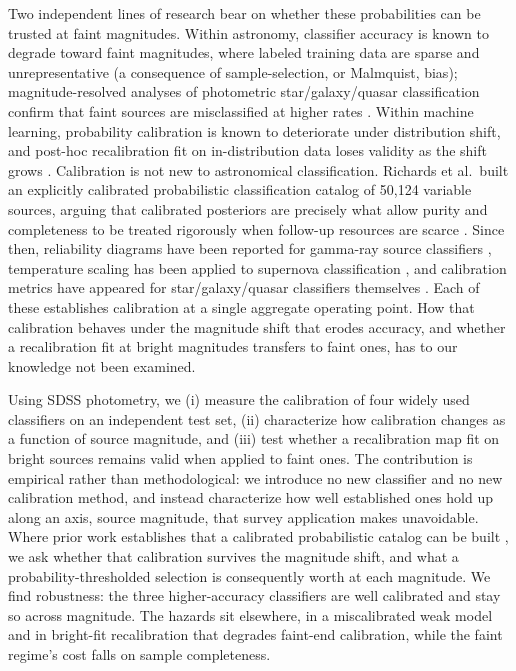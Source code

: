 \documentclass[conference]{IEEEtran}
\begin{document}
Two independent lines of research bear on whether these probabilities can be trusted at faint magnitudes. Within astronomy, classifier accuracy is known to degrade toward faint magnitudes, where labeled training data are sparse and unrepresentative (a consequence of sample-selection, or Malmquist, bias); magnitude-resolved analyses of photometric star/galaxy/quasar classification confirm that faint sources are misclassified at higher rates \cite{r9}. Within machine learning, probability calibration is known to deteriorate under distribution shift, and post-hoc recalibration fit on in-distribution data loses validity as the shift grows \cite{r5}. Calibration is not new to astronomical classification. Richards et al.\ built an explicitly calibrated probabilistic classification catalog of 50{,}124 variable sources, arguing that calibrated posteriors are precisely what allow purity and completeness to be treated rigorously when follow-up resources are scarce \cite{r13}. Since then, reliability diagrams have been reported for gamma-ray source classifiers \cite{r6}, temperature scaling has been applied to supernova classification \cite{r7}, and calibration metrics have appeared for star/galaxy/quasar classifiers themselves \cite{r12}. Each of these establishes calibration at a single aggregate operating point. How that calibration behaves under the magnitude shift that erodes accuracy, and whether a recalibration fit at bright magnitudes transfers to faint ones, has to our knowledge not been examined.

Using SDSS photometry, we (i) measure the calibration of four widely used classifiers on an independent test set, (ii) characterize how calibration changes as a function of source magnitude, and (iii) test whether a recalibration map fit on bright sources remains valid when applied to faint ones. The contribution is empirical rather than methodological: we introduce no new classifier and no new calibration method, and instead characterize how well established ones hold up along an axis, source magnitude, that survey application makes unavoidable. Where prior work establishes that a calibrated probabilistic catalog can be built \cite{r13}, we ask whether that calibration survives the magnitude shift, and what a probability-thresholded selection is consequently worth at each magnitude. We find robustness: the three higher-accuracy classifiers are well calibrated and stay so across magnitude. The hazards sit elsewhere, in a miscalibrated weak model and in bright-fit recalibration that degrades faint-end calibration, while the faint regime's cost falls on sample completeness.
\end{document}
